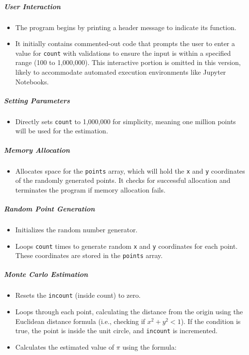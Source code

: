 \subparagraph{User Interaction}

\begin{itemize}
\item The program begins by printing a header message to indicate its function.
\item It initially contains commented-out code that prompts the user to enter a value for \texttt{count} with validations to ensure the input is within a specified range (100 to 1,000,000). This interactive portion is omitted in this version, likely to accommodate automated execution environments like Jupyter Notebooks.
\end{itemize}

\subparagraph{Setting Parameters}

\begin{itemize}
\item Directly sets \texttt{count} to 1,000,000 for simplicity, meaning one million points will be used for the estimation.
\end{itemize}

\subparagraph{Memory Allocation}

\begin{itemize}
\item Allocates space for the \texttt{points} array, which will hold the \texttt{x} and \texttt{y} coordinates of the randomly generated points. It checks for successful allocation and terminates the program if memory allocation fails.
\end{itemize}

\subparagraph{Random Point Generation}

\begin{itemize}
\item Initializes the random number generator.
\item Loops \texttt{count} times to generate random \texttt{x} and \texttt{y} coordinates for each point. These coordinates are stored in the \texttt{points} array.
\end{itemize}

\subparagraph{Monte Carlo Estimation}

\begin{itemize}
\item Resets the \texttt{incount} (inside count) to zero.
\item Loops through each point, calculating the distance from the origin using the Euclidean distance formula (i.e., checking if $x^2 + y^2 < 1$). If the condition is true, the point is inside the unit circle, and \texttt{incount} is incremented.
\item Calculates the estimated value of $\pi$ using the formula:
\end{itemize}


